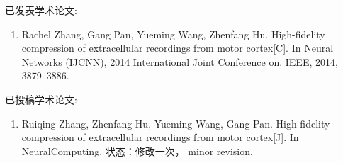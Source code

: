 \begin{publications}
已发表学术论文:
\begin{enumerate}
\item{Rachel Zhang, Gang Pan, Yueming Wang, Zhenfang Hu. High-fidelity compression of extracellular recordings from motor cortex[C]. In Neural Networks (IJCNN), 2014 International Joint Conference on. IEEE,
2014, 3879–3886.}
\end{enumerate}

已投稿学术论文:
\begin{enumerate}
\item{Ruiqing Zhang, Zhenfang Hu, Yueming Wang, Gang Pan. High-fidelity compression of extracellular recordings from motor cortex[J]. In NeuralComputing. 状态：修改一次， minor revision.}
\end{enumerate}
\end{publications}
